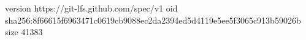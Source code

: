version https://git-lfs.github.com/spec/v1
oid sha256:8f66615f6963471c0619cb9088ec2da2394ed5d4119e5ee5f3065c913b59026b
size 41383
